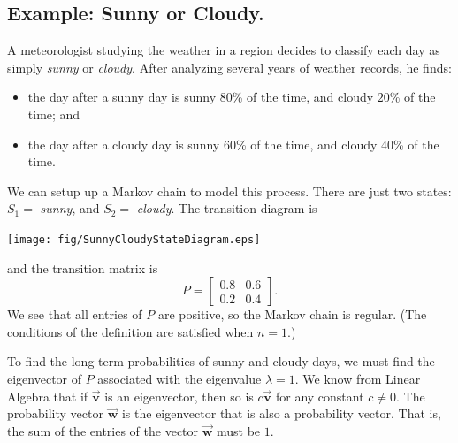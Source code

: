 \documentclass[reqno]{immbook}
\newcommand{\BV}{\vec{\textbf{v}}}
\newcommand{\BW}{\vec{\textbf{w}}}
\numberwithin{equation}{chapter}
\numberwithin{question}{section}
\numberwithin{theorem}{chapter}
\numberwithin{figure}{chapter}
\theoremstyle{definition}
\begin{document}
\subsection*{Example: Sunny or Cloudy.}
A meteorologist studying the weather in a region
decides to classify each day as simply \emph{sunny}
or \emph{cloudy}.  After analyzing several years of weather records,
he finds:
\begin{itemize}
\item the day after a sunny day is
sunny $80$\% of the time, and cloudy $20$\% of the time; and
\item the day after a cloudy day is
sunny $60$\% of the time, and cloudy $40$\% of the time.
\end{itemize}
We can setup up a Markov chain to model this process.
There are just two states: $S_1=$ \emph{sunny}, and $S_2 = $ \emph{cloudy}.
The transition diagram is

\medskip
\centerline{%
\texttt{[image: fig/SunnyCloudyStateDiagram.eps]}
}

\medskip
\noindent
and the transition matrix is
\begin{equation}
  P = \begin{bmatrix}
          0.8 & 0.6 \\
	  0.2 & 0.4 
      \end{bmatrix}.
\end{equation}
We see that all entries of $P$ are positive, so the Markov
chain is regular.  (The conditions of the 
definition are satisfied when $n=1$.)

To find the long-term probabilities of sunny and cloudy days,
we must find the eigenvector of $P$ associated with the
eigenvalue $\lambda=1$. We know from Linear Algebra that
if $\BV$ is an eigenvector, then so is $c\BV$ for any
constant $c\ne0$.  The probability vector $\BW$ is the
eigenvector that is also a probability vector. That is,
the sum of the entries of the vector $\BW$ must be $1$.
\end{document}
